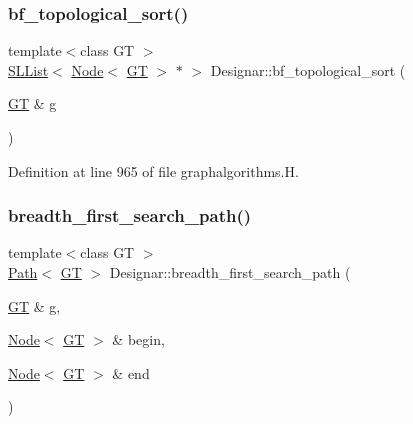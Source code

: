\mbox{\label{namespace_designar_a07df9972ab6dffccd12e4fffa2ff13c1}} 
\subsubsection{\texorpdfstring{bf\+\_\+topological\+\_\+sort()}{bf\_topological\_sort()}}
{\footnotesize\ttfamily template$<$class GT $>$ \\
\hyperlink{class_designar_1_1_s_l_list}{S\+L\+List}$<$ \hyperlink{namespace_designar_a5af326c65aa2bd26b26c410f2030d09e}{Node}$<$ \hyperlink{demo-buildgraph_8_c_a3001c40d2c31ca87ed96cd7d1334a55e}{GT} $>$ $\ast$ $>$ Designar\+::bf\+\_\+topological\+\_\+sort (\begin{DoxyParamCaption}\item[{\hyperlink{demo-buildgraph_8_c_a3001c40d2c31ca87ed96cd7d1334a55e}{GT} \&}]{g }\end{DoxyParamCaption})}



Definition at line 965 of file graphalgorithms.\+H.

\mbox{\label{namespace_designar_ae3e6a7d2cf21c1c23ea159ac3e0cef6a}} 
\subsubsection{\texorpdfstring{breadth\+\_\+first\+\_\+search\+\_\+path()}{breadth\_first\_search\_path()}}
{\footnotesize\ttfamily template$<$class GT $>$ \\
\hyperlink{class_designar_1_1_path}{Path}$<$ \hyperlink{demo-buildgraph_8_c_a3001c40d2c31ca87ed96cd7d1334a55e}{GT} $>$ Designar\+::breadth\+\_\+first\+\_\+search\+\_\+path (\begin{DoxyParamCaption}\item[{\hyperlink{demo-buildgraph_8_c_a3001c40d2c31ca87ed96cd7d1334a55e}{GT} \&}]{g,  }\item[{\hyperlink{namespace_designar_a5af326c65aa2bd26b26c410f2030d09e}{Node}$<$ \hyperlink{demo-buildgraph_8_c_a3001c40d2c31ca87ed96cd7d1334a55e}{GT} $>$ \&}]{begin,  }\item[{\hyperlink{namespace_designar_a5af326c65aa2bd26b26c410f2030d09e}{Node}$<$ \hyperlink{demo-buildgraph_8_c_a3001c40d2c31ca87ed96cd7d1334a55e}{GT} $>$ \&}]{end }\end{DoxyParamCaption})}



